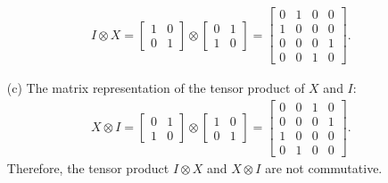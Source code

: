 \documentclass[en]{sol-man}
\begin{document}
\begin{sol}
\begin{itemize}
        \begin{align}
            I\otimes X=\begin{bmatrix}
                1&0\\
                0&1
            \end{bmatrix}\otimes\begin{bmatrix}
                0&1\\
                1&0
            \end{bmatrix}=\begin{bmatrix}
                0&1&0&0\\
                1&0&0&0\\
                0&0&0&1\\
                0&0&1&0
            \end{bmatrix}.
        \end{align}
        \item[(c)] The matrix representation of the tensor product of $X$ and $I$:
        \begin{align}
            X\otimes I=\begin{bmatrix}
                0&1\\
                1&0
            \end{bmatrix}\otimes\begin{bmatrix}
                1&0\\
                0&1
            \end{bmatrix}=\begin{bmatrix}
                0&0&1&0\\
                0&0&0&1\\
                1&0&0&0\\
                0&1&0&0
            \end{bmatrix}.
        \end{align}
        Therefore, the tensor product $I\otimes X$ and $X\otimes I$ are not commutative.
    \end{itemize}
\end{sol}
\end{document}
